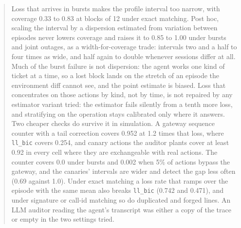 \documentclass[11pt]{article}
\begin{document}
\begin{abstract}
Loss that arrives in bursts makes the profile interval too narrow, with coverage
0.33 to 0.83 at blocks of 12 under exact matching. Post hoc, scaling the interval by
a dispersion estimated from variation between episodes never lowers coverage and
raises it to 0.85 to 1.00 under bursts and joint outages, as a width-for-coverage
trade: intervals two and a half to four times as wide, and half again to double
whenever sessions differ at all. Much of the burst failure is not dispersion: the
agent works one kind of ticket at a time, so a lost block lands on the stretch of
an episode the environment diff cannot see, and the point estimate is biased.
Loss that concentrates on those actions by kind, not by time, is not repaired by
any estimator variant tried: the estimator fails silently from a tenth more loss,
and stratifying on the operation stays calibrated only where it answers. Two
cheaper checks do survive it in simulation. A gateway sequence counter with a tail
correction covers 0.952 at 1.2 times that loss, where \texttt{ll\_bic} covers
0.254, and canary actions the auditor plants cover at least 0.92 in every cell
where they are exchangeable with real actions. The counter covers 0.0 under bursts
and 0.002 when 5\% of actions bypass the gateway, and the canaries' intervals are
wider and detect the gap less often (0.69 against 1.0). Under exact matching a loss
rate that ramps over the episode with the same mean also breaks \texttt{ll\_bic}
(0.742 and 0.471), and under signature or call-id matching so do duplicated and
forged lines. An LLM auditor reading the agent's transcript was either a copy of
the trace or empty in the two settings tried.


\end{abstract}
\end{document}
